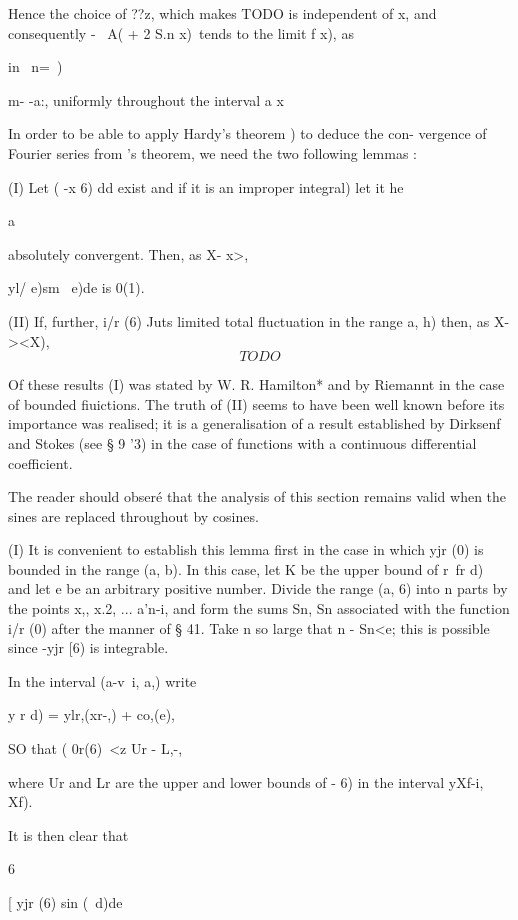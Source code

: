 Hence the choice of ??z, which makes
TODO
is independent of x, and consequently - \ A( + 2 S.n x)\ tends to the
limit f x), as

in \ n=\ )

m- -a:, uniformly throughout the interval a x%


In order to be able to apply Hardy's theorem ) to deduce the
con- vergence of Fourier series from \Fejer's theorem, we need the two
following lemmas :

(I) Let ( -x 6) dd exist and if it is an improper integral) let it he

  a

absolutely convergent. Then, as X- x>,

yl/ e)sm \ e)de is 0(1).

(II) If, further, i/r (6) Juts limited total fluctuation in the range
a, h) then, as X-><X),
$$
TODO
$$

%
%

Of these results (I) was stated by W. R. Hamilton* and by Riemannt in
the case of bounded fiuictions. The truth of (II) seems to have been
well known before its importance was realised; it is a generalisation
of a result established by Dirksenf and Stokes (see § 9 '3) in the
case of functions with a continuous differential coefficient.

The reader should obser\'e that the analysis of this section remains
valid when the sines are replaced throughout by cosines.

(I) It is convenient to establish this lemma first in the case in
which yjr (0) is bounded in the range (a, b). In this case, let K be
the upper bound of r\ fr d)\, and let e be an arbitrary positive
number. Divide the range (a, 6) into n parts by the points x,, x.2,
... a'n-i, and form the sums Sn, Sn associated with the function i/r
(0) after the manner of § 41. Take n so large that n - Sn<e; this is
possible since -yjr [6) is integrable.

In the interval (a-v\ i, a,) write

y r d) = ylr,(xr-,) + co,(e),

SO that ( 0r(6)\ <z Ur - L,-,

where Ur and Lr are the upper and lower bounds of - 6) in the interval
yXf-i, Xf).

It is then clear that

6

[ yjr (6) sin (\ d)de

